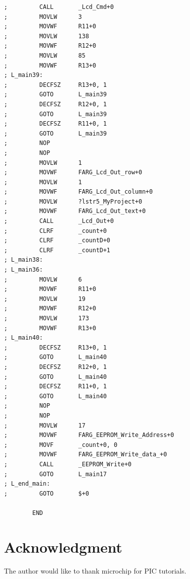 \documentclass[conference]{IEEEtran}
\begin{document}
\begin{lstlisting}
;         CALL       _Lcd_Cmd+0
;         MOVLW      3
;         MOVWF      R11+0
;         MOVLW      138
;         MOVWF      R12+0
;         MOVLW      85
;         MOVWF      R13+0
; L_main39:
;         DECFSZ     R13+0, 1
;         GOTO       L_main39
;         DECFSZ     R12+0, 1
;         GOTO       L_main39
;         DECFSZ     R11+0, 1
;         GOTO       L_main39
;         NOP
;         NOP
;         MOVLW      1
;         MOVWF      FARG_Lcd_Out_row+0
;         MOVLW      1
;         MOVWF      FARG_Lcd_Out_column+0
;         MOVLW      ?lstr5_MyProject+0
;         MOVWF      FARG_Lcd_Out_text+0
;         CALL       _Lcd_Out+0
;         CLRF       _count+0
;         CLRF       _countD+0
;         CLRF       _countD+1
; L_main38:
; L_main36:
;         MOVLW      6
;         MOVWF      R11+0
;         MOVLW      19
;         MOVWF      R12+0
;         MOVLW      173
;         MOVWF      R13+0
; L_main40:
;         DECFSZ     R13+0, 1
;         GOTO       L_main40
;         DECFSZ     R12+0, 1
;         GOTO       L_main40
;         DECFSZ     R11+0, 1
;         GOTO       L_main40
;         NOP
;         NOP
;         MOVLW      17
;         MOVWF      FARG_EEPROM_Write_Address+0
;         MOVF       _count+0, 0
;         MOVWF      FARG_EEPROM_Write_data_+0
;         CALL       _EEPROM_Write+0
;         GOTO       L_main17
; L_end_main:
;         GOTO       $+0

		END
\end{lstlisting}







\section*{Acknowledgment}


The author would like to thank microchip for PIC tutorials.







\end{document}
